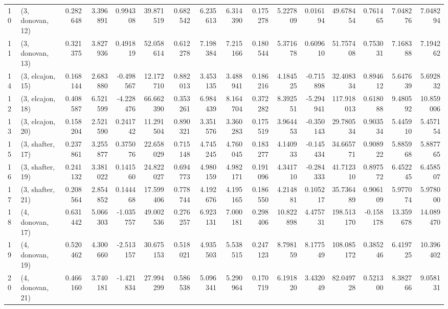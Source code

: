 \begin{tabular}{llrrrrrrrrrrrrrr}
10 &  (3, donovan, 12) &   0.282648 &  3.396891 &  0.994308 &  39.871519 &  0.682542 &   6.235613 &  6.314390 &  0.175278 &   5.227809 &  0.016194 &   49.678454 &  0.761465 &   7.048276 &   7.048294 \\
11 &  (3, donovan, 13) &   0.321375 &  3.827936 &  0.491819 &  52.058614 &  0.612278 &   7.198384 &  7.215166 &  0.180544 &   5.371678 &  0.609610 &   51.757408 &  0.753031 &   7.168388 &   7.194262 \\
14 &  (3, elcajon, 15) &   0.168144 &  2.683880 & -0.498567 &  12.172710 &  0.882013 &   3.453135 &  3.488941 &  0.186216 &   4.184525 & -0.715898 &   32.408334 &  0.894612 &   5.647639 &   5.692832 \\
12 &  (3, elcajon, 18) &   0.408587 &  6.521599 & -4.228476 &  66.662390 &  0.353261 &   6.984439 &  8.164704 &  0.372282 &   8.392551 & -5.294941 &  117.918013 &  0.618088 &   9.480592 &  10.859006 \\
13 &  (3, elcajon, 20) &   0.158204 &  2.521590 &  0.241742 &  11.291504 &  0.890321 &   3.351576 &  3.360283 &  0.175519 &   3.964453 & -0.350143 &   29.780534 &  0.903534 &   5.445910 &   5.457154 \\
15 &  (3, shafter, 17) &   0.237861 &  3.255877 &  0.375076 &  22.658029 &  0.715148 &   4.745245 &  4.760045 &  0.183277 &   4.140933 & -0.145434 &   34.665771 &  0.908922 &   5.885968 &   5.887765 \\
16 &  (3, shafter, 19) &   0.241132 &  3.381022 &  0.141560 &  24.822027 &  0.694773 &   4.980159 &  4.982171 &  0.191096 &   4.341710 & -0.284333 &   41.712310 &  0.897572 &   6.452245 &   6.458507 \\
17 &  (3, shafter, 21) &   0.208564 &  2.854852 &  0.144468 &  17.599406 &  0.778744 &   4.192676 &  4.195165 &  0.186550 &   4.214881 &  0.105217 &   35.736489 &  0.906109 &   5.977074 &   5.978000 \\
18 &  (4, donovan, 17) &   0.631442 &  5.066303 & -1.035757 &  49.002536 &  0.276257 &   6.923131 &  7.000181 &  0.298406 &  10.822898 &  4.475731 &  198.513170 & -0.158178 &  13.359678 &  14.089470 \\
19 &  (4, donovan, 19) &   0.520462 &  4.300660 & -2.513157 &  30.675153 &  0.518021 &   4.935503 &  5.538515 &  0.247123 &   8.798159 &  8.177549 &  108.085172 &  0.385246 &   6.419725 &  10.396402 \\
20 &  (4, donovan, 21) &   0.466160 &  3.740181 & -1.421834 &  27.994299 &  0.586538 &   5.096341 &  5.290964 &  0.170719 &   6.191820 &  3.432049 &   82.049728 &  0.521300 &   8.382766 &   9.058131 \\

\end{tabular}
